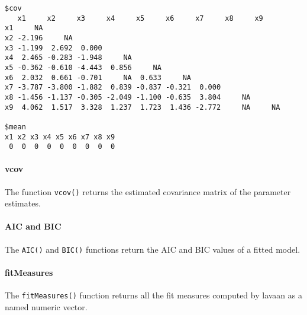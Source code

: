 \begin{Shaded}
\begin{Highlighting}[]
\StringTok{ } 
 \NormalTok{)}
\end{Highlighting}
\end{Shaded}

\begin{verbatim}
$cov
   x1     x2     x3     x4     x5     x6     x7     x8     x9    
x1     NA                                                        
x2 -2.196     NA                                                 
x3 -1.199  2.692  0.000                                          
x4  2.465 -0.283 -1.948     NA                                   
x5 -0.362 -0.610 -4.443  0.856     NA                            
x6  2.032  0.661 -0.701     NA  0.633     NA                     
x7 -3.787 -3.800 -1.882  0.839 -0.837 -0.321  0.000              
x8 -1.456 -1.137 -0.305 -2.049 -1.100 -0.635  3.804     NA       
x9  4.062  1.517  3.328  1.237  1.723  1.436 -2.772     NA     NA

$mean
x1 x2 x3 x4 x5 x6 x7 x8 x9 
 0  0  0  0  0  0  0  0  0 
\end{verbatim}

\paragraph{vcov}

The function \texttt{vcov()} returns the estimated covariance matrix of
the parameter estimates.

\paragraph{AIC and BIC}

The \texttt{AIC()} and \texttt{BIC()} functions return the AIC and BIC
values of a fitted model.

\paragraph{fitMeasures}

The \texttt{fitMeasures()} function returns all the fit measures
computed by lavaan as a named numeric vector.

\begin{Shaded}
\begin{Highlighting}[]
\StringTok{ } 
\end{Highlighting}
\end{Shaded}

